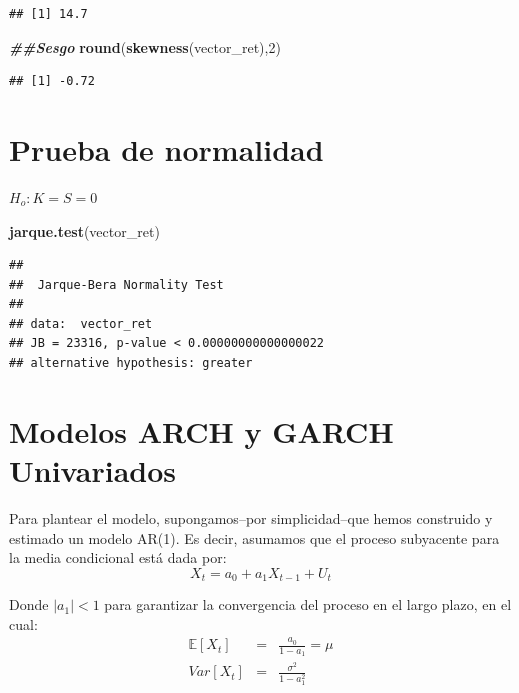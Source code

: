 \documentclass[
]{book}
\newenvironment{Shaded}{\begin{snugshade}}{\end{snugshade}}
\newcommand{\DecValTok}[1]{\textcolor[rgb]{0.00,0.00,0.81}{#1}}
\newcommand{\DocumentationTok}[1]{\textcolor[rgb]{0.56,0.35,0.01}{\textbf{\textit{#1}}}}
\newcommand{\FunctionTok}[1]{\textcolor[rgb]{0.13,0.29,0.53}{\textbf{#1}}}
\newcommand{\NormalTok}[1]{#1}
\begin{document}
\begin{verbatim}
## [1] 14.7
\end{verbatim}

\begin{Shaded}
\begin{Highlighting}[]
\DocumentationTok{\#\#Sesgo}
\FunctionTok{round}\NormalTok{(}\FunctionTok{skewness}\NormalTok{(vector\_ret),}\DecValTok{2}\NormalTok{)}
\end{Highlighting}
\end{Shaded}

\begin{verbatim}
## [1] -0.72
\end{verbatim}

\hypertarget{prueba-de-normalidad}{%
\section{Prueba de normalidad}\label{prueba-de-normalidad}}

\(H_o: K=S=0\)

\begin{Shaded}
\begin{Highlighting}[]
\FunctionTok{jarque.test}\NormalTok{(vector\_ret)}
\end{Highlighting}
\end{Shaded}

\begin{verbatim}
## 
##  Jarque-Bera Normality Test
## 
## data:  vector_ret
## JB = 23316, p-value < 0.00000000000000022
## alternative hypothesis: greater
\end{verbatim}

\hypertarget{modelos-arch-y-garch-univariados}{%
\section{Modelos ARCH y GARCH Univariados}\label{modelos-arch-y-garch-univariados}}

Para plantear el modelo, supongamos--por simplicidad--que hemos construido y estimado un modelo AR(1). Es decir, asumamos que el proceso subyacente para la media condicional está dada por:
\begin{equation}
    X_t = a_0 + a_1 X_{t-1} + U_t
\end{equation}

Donde \(| a_1 |< 1\) para garantizar la convergencia del proceso en el largo plazo, en el cual:
\begin{eqnarray*}
    \mathbb{E}[X_t] & = & \frac{a_0 }{1 - a_1} = \mu \\
    Var[X_t] & = & \frac{\sigma^2}{1 - a_1^2}
\end{eqnarray*}
\end{document}
